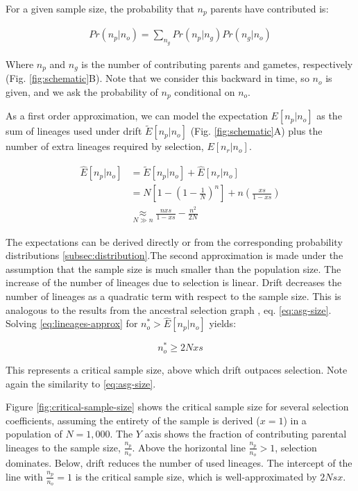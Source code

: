\documentclass[review]{elsarticle}
\begin{document}
For a given sample size, the probability that $n_p$ parents have contributed is:

\begin{align}
  \label{eq:conditional}
  Pr(n_p | n_o) = \sum_{n_g} Pr(n_p | n_g)Pr(n_g | n_o)
\end{align}

Where $n_p$ and $n_g$ is the number of contributing parents and gametes, respectively (Fig.
\ref{fig:schematic}B). Note that we consider this backward in time, so $n_o$ is given, and we ask
the probability of $n_p$ conditional on $n_o$.

As a first order approximation, we can model the expectation $E[n_p | n_o]$ as the sum of lineages
used under drift $\tilde{E}[n_p | n_o]$ (Fig. \ref{fig:schematic}A) plus the number of extra
lineages required by selection, $E[n_r | n_o]$.

\begin{equation*}
  \begin{aligned}
    \label{eq:lineages-approx}
    \hat{E}[n_p  | n_o] &= \tilde{E}[n_p | n_o] + \hat{E}[n_r | n_o] \\
    &= N\left[1-\left( 1 - \frac{1}{N} \right)^n \right] + n\left( \frac{xs}{1-xs}\right) \\
    &\underset{N\gg n}{\approx} \frac{nxs}{1-xs} - \frac{n^2}{2N}
  \end{aligned}
\end{equation*}

The expectations can be derived directly or from the corresponding probability distributions
\ref{subsec:distribution}.The second approximation is made under the assumption that the sample size
is much smaller than the population size. The increase of the number of lineages due to selection is
linear. Drift decreases the number of lineages as a quadratic term with respect to the sample size.
This is analogous to the results from the ancestral selection graph \citep{KroneNeuhauser1997}, eq.
\eqref{eq:asg-size}. Solving \eqref{eq:lineages-approx} for $n_o^* > \hat{E}[n_p | n_o]$ yields:

\begin{equation}
  \label{eq:critical-sample}
  n_o^* \ge 2Nxs
\end{equation}

This represents a critical sample size, above which drift outpaces selection.
Note again the similarity to \eqref{eq:asg-size}.

Figure \ref{fig:critical-sample-size} shows the critical sample size for several selection
coefficients, assuming the entirety of the sample is derived ($x=1$) in a population of $N=1,000$.
The $Y$ axis shows the fraction of contributing parental lineages to the sample size,
$\frac{n_p}{n_o}$. Above the horizontal line $\frac{n_p}{n_o} > 1$, selection dominates. Below,
drift reduces the number of used lineages. The intercept of the line with $\frac{n_p}{n_o} = 1$ is
the critical sample size, which is well-approximated by $2Nsx$.
\end{document}
